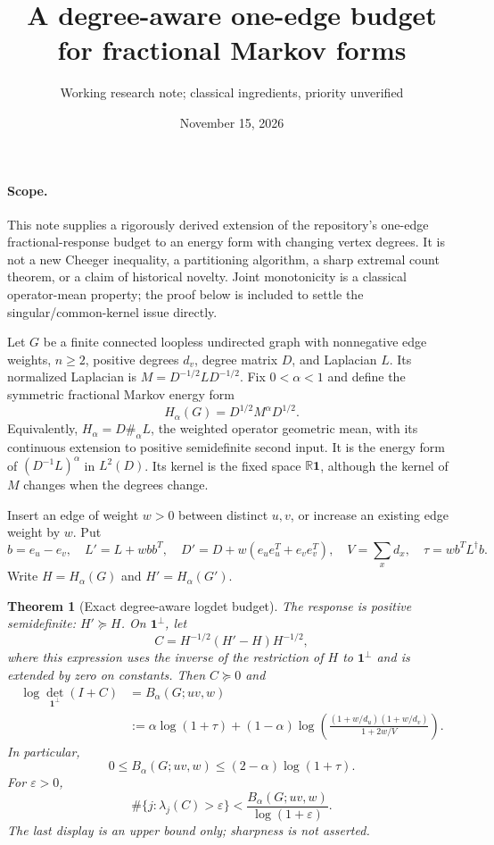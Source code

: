 \documentclass[11pt]{article}
\title{A degree-aware one-edge budget for fractional Markov forms}
\author{Working research note; classical ingredients, priority unverified}
\date{November 15, 2026}
\newtheorem{theorem}{Theorem}
\newcommand{\R}{\mathbb R}
\begin{document}
\maketitle

\paragraph{Scope.}
This note supplies a rigorously derived extension of the repository's
one-edge fractional-response budget to an energy form with changing vertex
degrees. It is not a new Cheeger inequality, a partitioning algorithm, a
sharp extremal count theorem, or a claim of historical novelty. Joint
monotonicity is a classical operator-mean property; the proof below is
included to settle the singular/common-kernel issue directly.

Let $G$ be a finite connected loopless undirected graph with nonnegative
edge weights, $n\ge2$, positive degrees $d_v$, degree matrix $D$, and
Laplacian $L$. Its normalized Laplacian is
$M=D^{-1/2}LD^{-1/2}$. Fix $0<\alpha<1$ and define the symmetric
fractional Markov energy form
\[
 H_\alpha(G)=D^{1/2}M^\alpha D^{1/2}.
\]
Equivalently, $H_\alpha=D\#_\alpha L$, the weighted operator geometric
mean, with its continuous extension to positive semidefinite second input.
It is the energy form of $(D^{-1}L)^\alpha$ in $L^2(D)$.
Its kernel is the fixed space $\R\mathbf1$, although the kernel of $M$
changes when the degrees change.

Insert an edge of weight $w>0$ between distinct $u,v$, or increase an
existing edge weight by $w$. Put
\[
 b=e_u-e_v,\quad L'=L+wbb^T,\quad
 D'=D+w(e_ue_u^T+e_ve_v^T),\quad V=\sum_xd_x,
 \quad \tau=w b^TL^\dagger b.
\]
Write $H=H_\alpha(G)$ and $H'=H_\alpha(G')$.

\begin{theorem}[Exact degree-aware logdet budget]
\label{thm:budget}
The response is positive semidefinite: $H'\succeq H$.
On $\mathbf1^\perp$, let
\[
 C=H^{-1/2}(H'-H)H^{-1/2},
\]
where this expression uses the inverse of the restriction of $H$ to
$\mathbf1^\perp$ and is extended by zero on constants. Then $C\succeq0$
and
\begin{align*}
 \log\det_{\mathbf1^\perp}(I+C)
 &=B_\alpha(G;uv,w)\\
 &:=\alpha\log(1+\tau)
 +(1-\alpha)\log\!\left(
 \frac{(1+w/d_u)(1+w/d_v)}{1+2w/V}\right).
\end{align*}
In particular,
\[
 0\le B_\alpha(G;uv,w)\le(2-\alpha)\log(1+\tau).
\]
For $\varepsilon>0$,
\[
 \#\{j:\lambda_j(C)>\varepsilon\}
 <\frac{B_\alpha(G;uv,w)}{\log(1+\varepsilon)}.
\]
The last display is an upper bound only; sharpness is not asserted.
\end{theorem}
\end{document}
